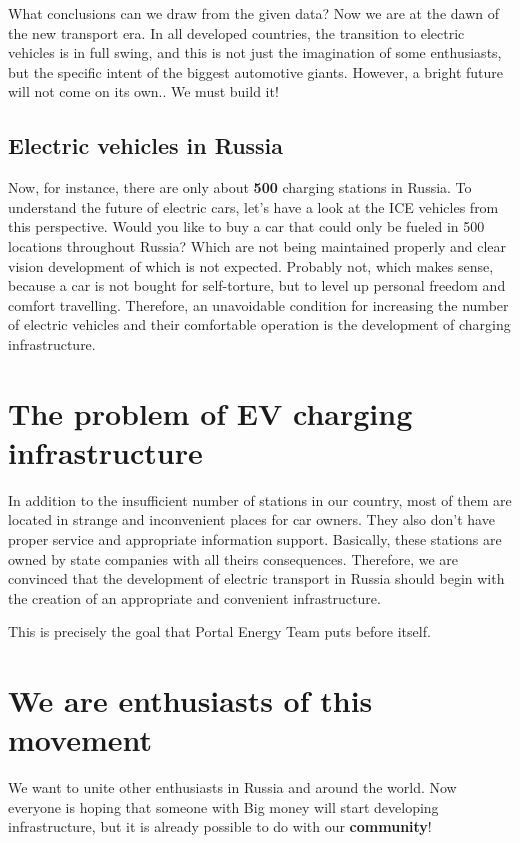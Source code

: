 \documentclass[a4paper,12pt]{report}
\begin{document}
What conclusions can we draw from the given data? Now we are at the dawn of the new  transport era. In all developed countries, the transition to electric vehicles is in full swing, and this is not just the imagination of some enthusiasts, but the specific intent of the biggest automotive giants.
However, a bright future will not come on its own.. We must build it!


\section{Electric vehicles in Russia}
Now, for instance, there are only  about \textbf{500}  charging stations in Russia. To understand  the future of electric cars, let's have a look at  the ICE vehicles from this perspective. Would you like to buy a car that could only be fueled in 500 locations throughout Russia? Which are not being maintained properly and  clear vision development  of which is not expected. Probably not,  which makes sense, because a  car is not bought for self-torture, but to level up personal freedom and comfort travelling. Therefore, an unavoidable condition for increasing the number of electric vehicles and their comfortable operation is the development of  charging infrastructure.


\chapter{The problem of EV charging infrastructure}
In addition to the  insufficient number of stations in our country, most of them are located in  strange and inconvenient places for car owners. They also don't have proper service and  appropriate information support. Basically, these stations are owned by state  companies  with all theirs consequences. Therefore, we are convinced that the development of electric transport in Russia should begin with the creation of an appropriate and convenient infrastructure.

This is precisely the goal that Portal Energy Team puts before itself.


\chapter{We are enthusiasts of this movement}
We want to unite other enthusiasts in Russia and around the world.
Now everyone is hoping that someone with Big money  will  start developing infrastructure, but it is already possible to do with  our \textbf{community}!
\end{document}
